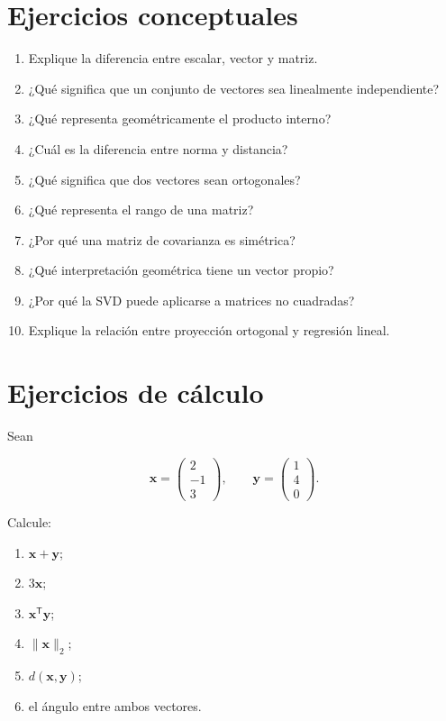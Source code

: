 \documentclass[
  spanish,
  11pt,
  letterpaper,
  DIV=11,
  numbers=noendperiod]{scrreprt}
\providecommand{\tightlist}{%
  \setlength{\itemsep}{0pt}\setlength{\parskip}{0pt}}
\theoremstyle{definition}
\theoremstyle{plain}
\theoremstyle{definition}
\theoremstyle{remark}
\begin{document}
\section{Ejercicios conceptuales}\label{ejercicios-conceptuales-1}

\begin{enumerate}
\def\labelenumi{\arabic{enumi}.}
\tightlist
\item
  Explique la diferencia entre escalar, vector y matriz.
\item
  ¿Qué significa que un conjunto de vectores sea linealmente
  independiente?
\item
  ¿Qué representa geométricamente el producto interno?
\item
  ¿Cuál es la diferencia entre norma y distancia?
\item
  ¿Qué significa que dos vectores sean ortogonales?
\item
  ¿Qué representa el rango de una matriz?
\item
  ¿Por qué una matriz de covarianza es simétrica?
\item
  ¿Qué interpretación geométrica tiene un vector propio?
\item
  ¿Por qué la SVD puede aplicarse a matrices no cuadradas?
\item
  Explique la relación entre proyección ortogonal y regresión lineal.
\end{enumerate}

\section{Ejercicios de cálculo}\label{ejercicios-de-cuxe1lculo}

Sean

\[
\mathbf{x}
=
\begin{pmatrix}
2\\
-1\\
3
\end{pmatrix},
\qquad
\mathbf{y}
=
\begin{pmatrix}
1\\
4\\
0
\end{pmatrix}.
\]

Calcule:

\begin{enumerate}
\def\labelenumi{\arabic{enumi}.}
\tightlist
\item
  \(\mathbf{x}+\mathbf{y}\);
\item
  \(3\mathbf{x}\);
\item
  \(\mathbf{x}^{\mathsf T}\mathbf{y}\);
\item
  \(\|\mathbf{x}\|_2\);
\item
  \(d(\mathbf{x},\mathbf{y})\);
\item
  el ángulo entre ambos vectores.
\end{enumerate}
\end{document}
